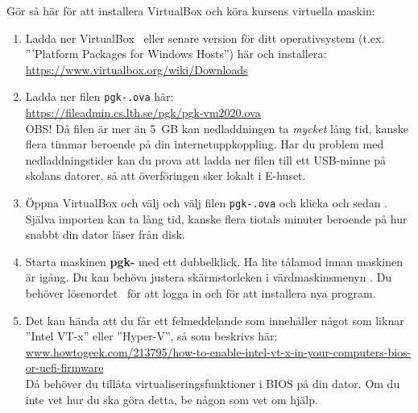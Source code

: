 Gör så här för att installera VirtualBox och köra kursens virtuella maskin:
\begin{enumerate}
\item  Ladda ner VirtualBox \VirtualBoxVersion~eller senare version för ditt operativsystem (t.ex. '''Platform Packages for Windows Hosts'') här och installera: \\ \url{https://www.virtualbox.org/wiki/Downloads}


\item     Ladda ner filen \texttt{pgk-\VMName.ova} här: \\ \url{https://fileadmin.cs.lth.se/pgk/pgk-vm2020.ova} \\ OBS! Då filen är mer än 5~GB kan nedladdningen ta \textit{mycket} lång tid, kanske flera timmar beroende på din internetuppkoppling. Har du problem med nedladdningstider kan du prova att ladda ner filen till ett USB-minne på skolans datorer, så att överföringen sker lokalt i E-huset.

\item     Öppna VirtualBox och välj  och välj filen \texttt{pgk-\VMName.ova} och klicka  och sedan . Själva importen kan ta lång tid, kanske flera tiotals minuter beroende på hur snabbt din dator läser från disk.

\item Starta maskinen \textbf{pgk-\VMName} med ett dubbelklick. Ha lite tålamod innan maskinen är igång. Du kan behöva justera skärmstorleken i värdmaskinsmenyn . Du  behöver lösenordet~\textbf{\texttt{\VMPassword}} för att logga in och för att installera nya program. 

\item Det kan hända att du får ett felmeddelande som innehåller något som liknar ''Intel VT-x'' eller ''Hyper-V'', så som beskrivs här:
\\ \href{http://www.howtogeek.com/213795/how-to-enable-intel-vt-x-in-your-computers-bios-or-uefi-firmware/}{www.howtogeek.com/213795/how-to-enable-intel-vt-x-in-your-computers-bios-or-uefi-firmware}\\
Då behöver du tillåta virtualiseringsfunktioner i BIOS på din dator. Om du inte vet hur du ska göra detta, be någon som vet om hjälp.


\end{enumerate}
